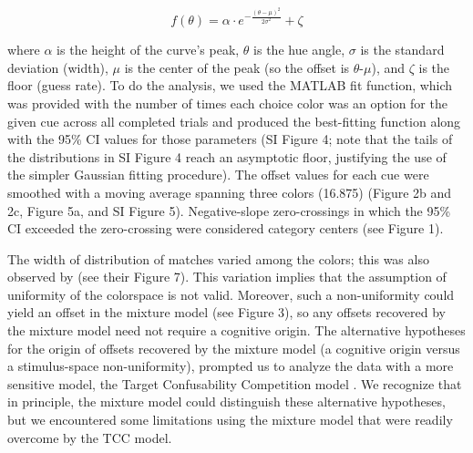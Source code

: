 \documentclass[9pt,biorxiv,lineno,onehalfspacing]{lapreprint}
\begin{document}
\begin{refsection}


\begin{equation} \label{eq:GaussianEquation}
    f(\theta) = {\alpha} \cdot e^{-\frac{(\theta-{\mu})^2}{2{\sigma}^2}} + {\zeta}        
\end{equation}



where $\alpha$ is the height of the curve's peak, $\theta$ is the hue angle, $\sigma$ is the standard deviation (width), $\mu$ is the center of the peak (so the offset is $\theta$-$\mu$), and $\zeta$ is the floor (guess rate). 
To do the analysis, we used the MATLAB fit function, which was provided with the number of times each choice color was an option for the given cue across all completed trials and produced the best-fitting function along with the 95\% CI values for those parameters (SI Figure 4; note that the tails of the distributions in SI Figure 4 reach an asymptotic floor, justifying the use of the simpler Gaussian fitting procedure). 
The offset values for each cue were smoothed with a moving average spanning three colors (16.875\degree{}) (Figure 2b and 2c, Figure 5a, and SI Figure 5). 
Negative-slope zero-crossings in which the 95\% CI exceeded the zero-crossing were considered category centers (see Figure 1).

The width of distribution of matches varied among the colors; this was also observed by \citet{bae_why_2015} (see their Figure 7). 
This variation implies that the assumption of uniformity of the colorspace is not valid. 
Moreover, such a non-uniformity could yield an offset in the mixture model (see Figure 3), so any offsets recovered by the mixture model need not require a cognitive origin.  
The alternative hypotheses for the origin of offsets recovered by the mixture model (a cognitive origin versus a stimulus-space non-uniformity), prompted us to analyze the data with a more sensitive model, the Target Confusability Competition model \citep{schurgin_psychophysical_2020}.
We recognize that in principle, the mixture model could distinguish these alternative hypotheses, but we encountered some limitations using the mixture model that were readily overcome by the TCC model. 


\end{refsection}
\end{document}
